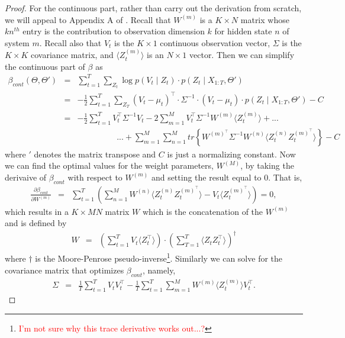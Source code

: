\documentclass{amsart}
\begin{document}
\begin{proof}
For the continuous part, rather than carry out the derivation from scratch, 
we will appeal to Appendix A of \cite{GJ95}.  Recall that $W^{(m)}$ is 
a $K\times N$ matrix whose $kn^{th}$ entry is the contribution to 
observation dimension $k$ for hidden state $n$ of system $m$.  Recall 
also that $V_t$ is the $K\times 1$ continuous observation vector, 
$\Sigma$ is the $K\times K$ covariance matrix, and $\langle Z_t^{(m)}\rangle$
is an $N\times 1$ vector.  Then we can simplify the continuous part of 
$\beta$ as 
\begin{eqnarray*}
\beta_{cont}(\Theta,\Theta') & = & \sum_{t=1}^T\sum_{Z_t}\log p(V_t\mid 
Z_t)\cdot p(Z_t\mid X_{1:T},\Theta')\\ 
& = & -\frac{1}{2}\sum_{t=1}^T\sum_{Z_T}(V_t-\mu_t)^\intercal\cdot 
\Sigma^{-1}\cdot (V_t-\mu_t)\cdot p(Z_t\mid X_{1:T},\Theta') - C\\
& = & -\frac{1}{2}\sum_{t=1}^TV_t^\intercal\Sigma^{-1} 
V_t-2\sum_{m=1}^MV_t^\intercal\Sigma^{-1}W^{(m)}\langle Z_t^{(m)}\rangle 
+...\\
&&\hspace{2cm}...+\sum_{m=1}^M\sum_{n=1}^Mtr\left\{W^{(m)^\intercal}\Sigma^{-1} W^{(n)}
\langle Z_t^{(n)}Z_t^{(m)^\intercal}\rangle\right\} - C
\end{eqnarray*}
where $'$ denotes the matrix transpose and $C$ is just a normalizing 
constant.  Now we can find the optimal values for the weight 
parameters, $W^{(M)}$, by taking the derivaive of $\beta_{cont}$ with 
respect to $W^{(m)}$ and setting the result equal to 0.  That is, 
\begin{eqnarray*}
\frac{\partial \beta_{cont}}{\partial W^{(m)}} & = & 
\sum_{t=1}^T\left(\sum_{n=1}^M W^{(n)}\langle 
Z_t^{(n)}Z_t^{(m)^\intercal}\rangle - V_t\langle Z_t^{(m)^\intercal}\rangle\right) = 0,
\end{eqnarray*}
which results in a $K\times MN$ matrix $W$ which is the concatenation 
of the $W^{(m)}$ and is defined by 
\begin{eqnarray*}
W & = & \left(\sum_{t=1}^TV_t\langle Z_t^\intercal\rangle\right)\cdot 
\left(\sum_{T=1}^T\langle 
Z_tZ_t^\intercal\rangle\right)^\dagger
\end{eqnarray*}
where $\dagger$ is the Moore-Penrose 
pseudo-inverse\footnote{\textcolor{red}{I'm not sure why this trace 
derivative works out...?}}. Similarly we can solve for the covariance 
matrix that optimizes $\beta_{cont}$, namely, 
\begin{eqnarray*}
\Sigma & = & \frac{1}{T}\sum_{t=1}^T V_tV_t^\intercal - 
\frac{1}{T}\sum_{t=1}^T\sum_{m=1}^MW^{(m)}\langle Z_t^{(m)}\rangle 
V_t^\intercal. 
\end{eqnarray*}

\end{proof}
\end{document}
